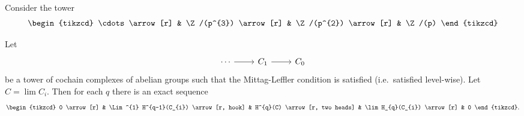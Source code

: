 \documentclass[main.tex]{subfiles}
\begin{document}
\begin{example}
  Consider the tower
  \begin{equation*}
    \begin{tikzcd}
      \cdots
      \arrow[r]
      & \Z/(p^{3})
      \arrow[r]
      & \Z/(p^{2})
      \arrow[r]
      & \Z/(p)
    \end{tikzcd}
  \end{equation*}
\end{example}

\begin{theorem}
  \label{thm:milnor_sequence}
  Let
  \begin{equation*}
    \begin{tikzcd}
      \cdots
      \arrow[r]
      & C_{1}
      \arrow[r]
      & C_{0}
    \end{tikzcd}
  \end{equation*}
  be a tower of cochain complexes of abelian groups such that the Mittag-Leffler condition is satisfied (i.e.\ satisfied level-wise). Let \(C = \lim C_{i}\). Then for each \(q\) there is an exact sequence
  \begin{equation*}
    \begin{tikzcd}
      0
      \arrow[r]
      & \Lim^{1} H^{q-1}(C_{i})
      \arrow[r, hook]
      & H^{q}(C)
      \arrow[r, two heads]
      & \lim H_{q}(C_{i})
      \arrow[r]
      & 0
    \end{tikzcd}.
  \end{equation*}
\end{theorem}
\end{document}
